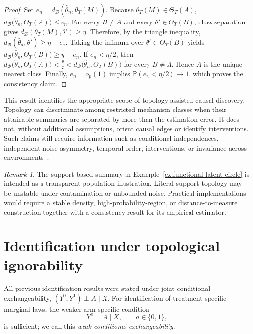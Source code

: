 \documentclass[11pt,a4paper]{article}
\theoremstyle{plain}
\theoremstyle{definition}
\theoremstyle{remark}
\newtheorem{remark}[theorem]{Remark}
\newcommand{\1}{\mathbbm{1}}
\begin{document}
\begin{proof}
Set \(e_n = d_{\mathcal B}(\widehat\theta_n,\theta_T(M))\). Because \(\theta_T(M)\in\Theta_T(A)\),
\(d_{\mathcal B}\bigl(\widehat\theta_n,\Theta_T(A)\bigr)
\leq e_n\). For every \(B\neq A\) and every
\(\theta'\in\Theta_T(B)\), class separation gives
\(d_{\mathcal B}(\theta_T(M),\theta')\geq\eta\). Therefore, by the triangle inequality,
\(d_{\mathcal B}(\widehat\theta_n,\theta') \geq
\eta-e_n\). Taking the infimum over \(\theta'\in\Theta_T(B)\) yields \(d_{\mathcal B}\bigl(\widehat\theta_n,\Theta_T(B)\bigr)
\geq \eta-e_n\). If \(e_n<\eta/2\), then
\(d_{\mathcal B}\bigl(\widehat\theta_n,\Theta_T(A)\bigr) <
\frac{\eta}{2} < d_{\mathcal B}\bigl(\widehat\theta_n,\Theta_T(B)\bigr)\) for every \(B\neq A\). Hence \(A\) is the unique nearest
class. Finally, \(e_n=o_p(1)\) implies
\(\mathbb P(e_n<\eta/2)\to1\), which proves the consistency
claim.
\end{proof}

This result identifies the appropriate scope of topology-assisted causal discovery. Topology can discriminate among restricted mechanism classes when their attainable summaries are separated by more than the estimation error. It does not, without additional assumptions, orient causal edges or identify interventions. Such claims still require
information such as conditional independences, independent-noise asymmetry, temporal order, interventions, or invariance across environments~\citep{spirtes2000,pearl2009}.

\begin{remark}
The support-based summary in
Example~\ref{ex:functional-latent-circle} is intended as a transparent population illustration. Literal support topology may be unstable under contamination or unbounded noise. Practical implementations would require a stable density, high-probability-region, or distance-to-measure construction together with a consistency result for its empirical estimator.
\end{remark}


\section{Identification under topological ignorability}
\label{sec:topological-ignorability}

All previous identification results were stated under joint conditional exchangeability, \((Y^0,Y^1)\perp A\mid X\). For identification of treatment-specific marginal laws, the weaker arm-specific condition
\[
Y^a\perp A\mid X,
\qquad
a\in\{0,1\},
\]
is sufficient; we call this \emph{weak conditional exchangeability}.
\end{document}
